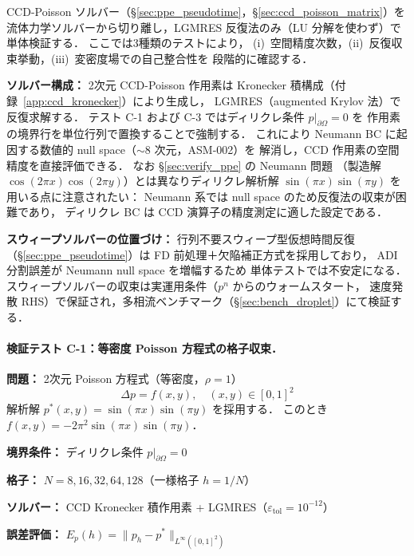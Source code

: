%

CCD-Poisson ソルバー（§\ref{sec:ppe_pseudotime}，§\ref{sec:ccd_poisson_matrix}）を
流体力学ソルバーから切り離し，LGMRES 反復法のみ（LU 分解を使わず）で単体検証する．
ここでは3種類のテストにより，
(i)~空間精度次数，(ii)~反復収束挙動，(iii)~変密度場での自己整合性を
段階的に確認する．

\noindent\textbf{ソルバー構成：}
2次元 CCD-Poisson 作用素は Kronecker 積構成（付録~\ref{app:ccd_kronecker}）により生成し，
LGMRES（augmented Krylov 法）で反復求解する．
テスト C-1 および C-3 ではディリクレ条件 $p|_{\partial\Omega}=0$ を
作用素の境界行を単位行列で置換することで強制する．
これにより Neumann BC に起因する数値的 null space（$\sim\!8$ 次元，ASM-002）を
解消し，CCD 作用素の空間精度を直接評価できる．
なお §\ref{sec:verify_ppe} の Neumann 問題
（製造解 $\cos(2\pi x)\cos(2\pi y)$）とは異なりディリクレ解析解
$\sin(\pi x)\sin(\pi y)$ を用いる点に注意されたい：
Neumann 系では null space のため反復法の収束が困難であり，
ディリクレ BC は CCD 演算子の精度測定に適した設定である．

\noindent\textbf{スウィープソルバーの位置づけ：}
行列不要スウィープ型仮想時間反復（§\ref{sec:ppe_pseudotime}）は
FD 前処理＋欠陥補正方式を採用しており，
ADI 分割誤差が Neumann null space を増幅するため
単体テストでは不安定になる．
スウィープソルバーの収束は実運用条件（$p^n$ からのウォームスタート，
速度発散 RHS）で保証され，多相流ベンチマーク（§\ref{sec:bench_droplet}）にて検証する．

\paragraph{検証テスト C-1：等密度 Poisson 方程式の格子収束．}
\label{sec:ccd_test_c1}

\begin{tcolorbox}[algbox, title={テスト C-1 の設定}]
\textbf{問題：} 2次元 Poisson 方程式（等密度，$\rho = 1$）
\[
  \Delta p = f(x,y), \quad (x,y) \in [0,1]^2
\]
解析解 $p^*(x,y) = \sin(\pi x)\sin(\pi y)$ を採用する．
このとき $f(x,y) = -2\pi^2\sin(\pi x)\sin(\pi y)$．

\textbf{境界条件：} ディリクレ条件 $p|_{\partial\Omega} = 0$

\textbf{格子：} $N = 8, 16, 32, 64, 128$（一様格子 $h = 1/N$）

\textbf{ソルバー：} CCD Kronecker 積作用素 + LGMRES（$\varepsilon_{\mathrm{tol}} = 10^{-12}$）

\textbf{誤差評価：}
$E_p(h) = \|p_h - p^*\|_{L^\infty([0,1]^2)}$
\end{tcolorbox}

